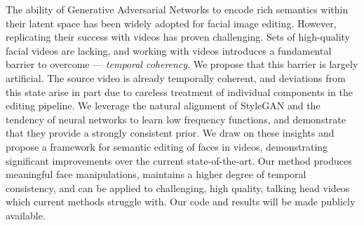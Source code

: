 The ability of Generative Adversarial Networks to encode rich semantics within their latent space has been widely adopted for facial image editing. However, replicating their success with videos has proven challenging. Sets of high-quality facial videos are lacking, and working with videos introduces a fundamental barrier to overcome --- \textit{temporal coherency}. We propose that this barrier is largely artificial. The source video is already temporally coherent, and deviations from this state arise in part due to careless treatment of individual components in the editing pipeline. We leverage the natural alignment of StyleGAN and the tendency of neural networks to learn low frequency functions, and demonstrate that they provide a strongly consistent prior. We draw on these insights and propose a framework for semantic editing of faces in videos, demonstrating significant improvements over the current state-of-the-art. Our method produces meaningful face manipulations, maintains a higher degree of temporal consistency, and can be applied to challenging, high quality, talking head videos which current methods struggle with. Our code and results will be made publicly available.
